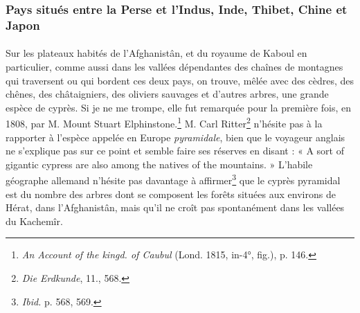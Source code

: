 \documentclass{article}
\begin{document}
\subsubsection{Pays situés entre la Perse et l'Indus, Inde, Thibet, Chine et Japon}
\paragraph{}
Sur les plateaux habités de l'Afghanistân, et du royaume de Kaboul en particulier, comme aussi dans les vallées dépendantes des chaînes de montagnes qui traversent ou qui bordent ces deux pays, on trouve, mêlée avec des cèdres, des chênes, des châtaigniers, des oliviers sauvages et d'autres arbres, une grande espèce de cyprès. Si je ne me trompe, elle fut remarquée pour la première fois, en 1808, par M. Mount Stuart Elphinstone.\footnote{\emph{An Account of the kingd. of Caubul} (Lond. 1815, in-4°, fig.), p. 146.} M. Carl Ritter\footnote{\emph{Die Erdkunde}, 11., 568.} n'hésite pas à la rapporter à l'espèce appelée en Europe \emph{pyramidale}, bien que le voyageur anglais ne s'explique pas sur ce point et semble faire ses réserves en disant : « A sort of gigantic cypress are also among the natives of the mountains. » L'habile géographe allemand n'hésite pas davantage à affirmer\footnote{\emph{Ibid.} p. 568, 569.} que le cyprès pyramidal est du nombre des arbres dont se composent les forêts situées aux environs de Hérat, dans l'Afghanistân, mais qu'il ne croît pas spontanément dans les vallées du Kachemîr.
\end{document}
